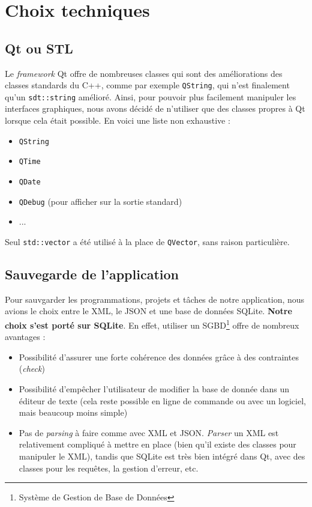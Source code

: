 \section{Choix techniques}

\subsection{Qt ou STL}

Le \textit{framework} Qt offre de nombreuses classes qui sont des améliorations des classes standards du C++, comme par exemple \lstinline{QString}, qui n'est finalement qu'un \lstinline{sdt::string} amélioré. Ainsi, pour pouvoir plus facilement manipuler les interfaces graphiques, nous avons décidé de n'utiliser que des classes propres à Qt lorsque cela était possible. En voici une liste non exhaustive :
\begin{itemize}
  \item \lstinline{QString}
  \item \lstinline{QTime}
  \item \lstinline{QDate}
  \item \lstinline{QDebug} (pour afficher sur la sortie standard)
  \item ...
\end{itemize}
Seul \lstinline{std::vector} a été utilisé à la place de \lstinline{QVector}, sans raison particulière.

\subsection{Sauvegarde de l'application}
Pour sauvgarder les programmations, projets et tâches de notre application, nous avions le choix entre le XML, le JSON et une base de données SQLite. \textbf{Notre choix s'est porté sur SQLite}. En effet, utiliser un SGBD\footnote{Système de Gestion de Base de Données} offre de nombreux avantages :
\begin{itemize}
  \item Possibilité d'assurer une forte cohérence des données grâce à des contraintes (\textit{check})
  \item Possibilité d'empêcher l'utilisateur de modifier la base de donnée dans un éditeur de texte (cela reste possible en ligne de commande ou avec un logiciel, mais beaucoup moins simple)
  \item Pas de \textit{parsing} à faire comme avec XML et JSON. \textit{Parser} un XML est relativement compliqué à mettre en place (bien qu'il existe des classes pour manipuler le XML), tandis que SQLite est très bien intégré dans Qt, avec des classes pour les requêtes, la gestion d'erreur, etc.
\end{itemize}

